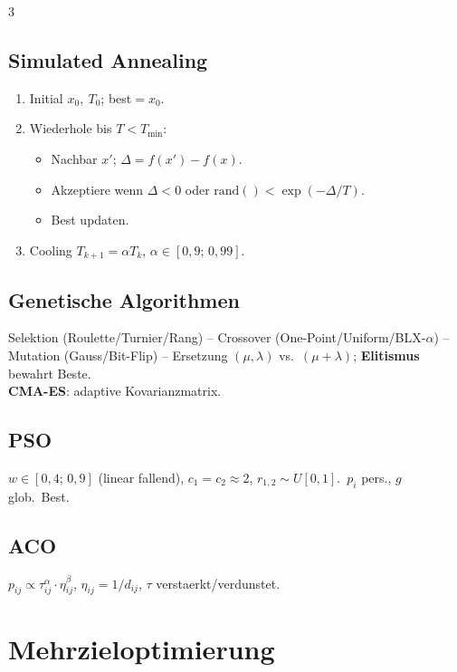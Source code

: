 \documentclass[8pt,a4paper]{extarticle}
\begin{document}
\begin{multicols*}{3}
\subsection{Simulated Annealing}
\begin{enumerate}
\item Initial $x_0,\ T_0$; best$=x_0$.
\item Wiederhole bis $T<T_{\min}$:
  \begin{itemize}
  \item Nachbar $x'$; $\Delta=f(x'){-}f(x)$.
  \item Akzeptiere wenn $\Delta<0$ oder $\text{rand}()<\exp(-\Delta/T)$.
  \item Best updaten.
  \end{itemize}
\item Cooling $T_{k+1}=\alpha T_k$, $\alpha\!\in\![0{,}9;\,0{,}99]$.
\end{enumerate}

\subsection{Genetische Algorithmen}
Selektion (Roulette/Turnier/Rang) -- Crossover (One-Point/Uniform/BLX-$\alpha$) -- Mutation (Gauss/Bit-Flip) -- Ersetzung $(\mu,\lambda)$ vs.\ $(\mu{+}\lambda)$; \textbf{Elitismus} bewahrt Beste.\\
\textbf{CMA-ES}: adaptive Kovarianzmatrix.

\subsection{PSO}
$w\!\in\![0{,}4;\,0{,}9]$ (linear fallend), $c_1{=}c_2\!\approx\!2$, $r_{1,2}\!\sim\!U[0,1]$.\ $p_i$ pers., $g$ glob.\ Best.

\subsection{ACO}
$p_{ij}\propto \tau_{ij}^\alpha\cdot\eta_{ij}^\beta$, $\eta_{ij}{=}1/d_{ij}$, $\tau$ verstaerkt/verdunstet.

\section{Mehrzieloptimierung}

\end{multicols*}
\end{document}
